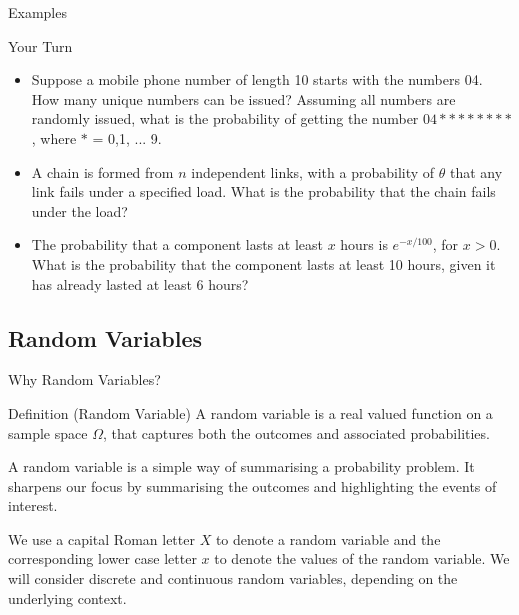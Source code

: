\documentclass[t,xcolor=pdftex,dvipsnames,table]{beamer}
\begin{document}
\begin{frame}{Examples}
\begin{alertblock}{Your Turn}
\begin{itemize}
\item Suppose a mobile phone number of length 10 starts with the numbers 04.  How many unique numbers can be issued?  Assuming all numbers are randomly issued, what is the probability of getting the number $04********$, where $*$ = 0,1, ... 9.  \\

\item A chain is formed from $n$ independent links, with a probability of $\theta$ that any link fails under a  specified load. What is the probability that the chain fails under the load? 

\item The probability that a component lasts at least $x$ hours is $e^{-x/100}$, for $x > 0$. What is the probability  that the component lasts at least 10 hours, given it has already lasted at least 6 hours? 
\end{itemize}
\end{alertblock}
\end{frame}

\subsection[]{Random Variables}
\begin{frame}{Why Random Variables?}

\begin{block}{Definition (Random Variable)}
A random variable is a real valued function on a sample space $\Omega$, that 
captures both the outcomes and associated probabilities.
\end{block}

A random variable is a simple way of summarising a probability problem. It sharpens our focus by summarising the outcomes and highlighting the events of interest. 

\vspace{.5cm}
We use a capital Roman letter $X$ to denote a random variable and the corresponding lower case letter $x$ to denote the values of the random variable. We will consider discrete and continuous random variables, depending on the underlying context.
\end{frame}
\end{document}
